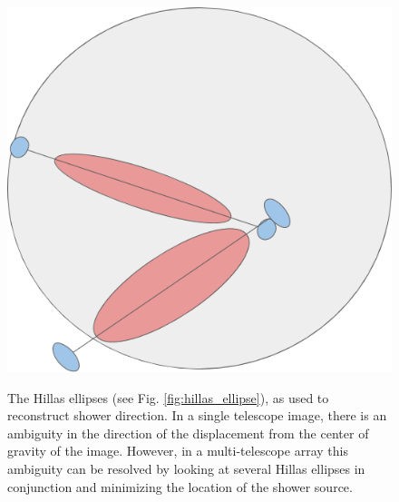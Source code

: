 \documentclass[main.tex]{subfiles}
\begin{document}
\begin{figure}[H]
  \begin{center}
      \includegraphics[width=0.48\linewidth]{images/Disp_FOV}
      \label{fig:Disp_FOV}
  \end{center}
  \caption[The Disp Parameter]{The Hillas ellipses (see Fig. \ref{fig:hillas_ellipse}), as used to reconstruct shower direction. In a single telescope image, there is an ambiguity in the direction of the displacement from the center of gravity of the image. However, in a multi-telescope array this ambiguity can be resolved by looking at several Hillas ellipses in conjunction and minimizing the location of the shower source.}
  \label{fig:Disp_FOV}
\end{figure}

\end{document}
